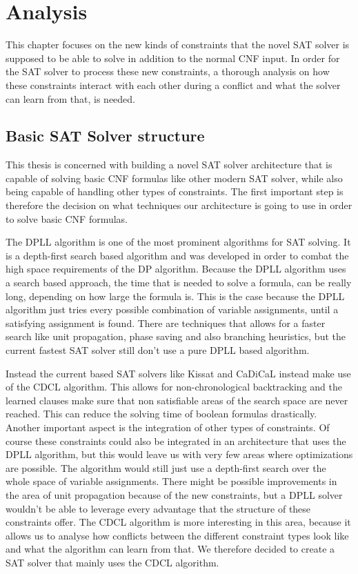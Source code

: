 \chapter{Analysis}
\label{ch:Analysis}

This chapter focuses on the new kinds of constraints that the novel SAT solver is supposed to be able to solve in addition to the normal CNF input. In order for the SAT solver to process these new constraints, a thorough analysis on how these constraints interact with each other during a conflict and what the solver can learn from that, is needed.

\section{Basic SAT Solver structure}

This thesis is concerned with building a novel SAT solver architecture that is capable of solving basic CNF formulas like other modern SAT solver, while also being capable of handling other types of constraints. The first important step is therefore the decision on what techniques our architecture is going to use in order to solve basic CNF formulas.

The DPLL algorithm is one of the most prominent algorithms for SAT solving. It is a depth-first search based algorithm and was developed in order to combat the high space requirements of the DP algorithm. Because the DPLL algorithm uses a search based approach, the time that is needed to solve a formula, can be really long, depending on how large the formula is. This is the case because the DPLL algorithm just tries every possible combination of variable assignments, until a satisfying assignment is found. There are techniques that allows for a faster search like unit propagation, phase saving and also branching heuristics, but the current fastest SAT solver still don't use a pure DPLL based algorithm.

Instead the current based SAT solvers like Kissat \cite{BiereFazekasFleuryHeisinger-SAT-Competition-2020-solvers} and CaDiCaL \cite{Biere-SAT-Competition-2017-solvers} instead make use of the CDCL algorithm. This allows for non-chronological backtracking and the learned clauses make sure that non satisfiable areas of the search space are never reached. This can reduce the solving time of boolean formulas drastically. Another important aspect is the integration of other types of constraints. Of course these constraints could also be integrated in an architecture that uses the DPLL algorithm, but this would leave us with very few areas where optimizations are possible. The algorithm would still just use a depth-first search over the whole space of variable assignments. There might be possible improvements in the area of unit propagation because of the new constraints, but a DPLL solver wouldn't be able to leverage every advantage that the structure of these constraints offer. The CDCL algorithm is more interesting in this area, because it allows us to analyse how conflicts between the different constraint types look like and what the algorithm can learn from that. We therefore decided to create a SAT solver that mainly uses the CDCL algorithm.

